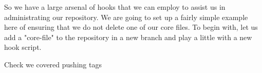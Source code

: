 So we have a large arsenal of hooks that we can employ to assist us in administrating our repository.
We are going to set up a fairly simple example here of ensuring that we do not delete one of our core files.
To begin with, let us add a "core-file" to the repository in a new branch and play a little with a new hook script.



Check we covered 
pushing tags
